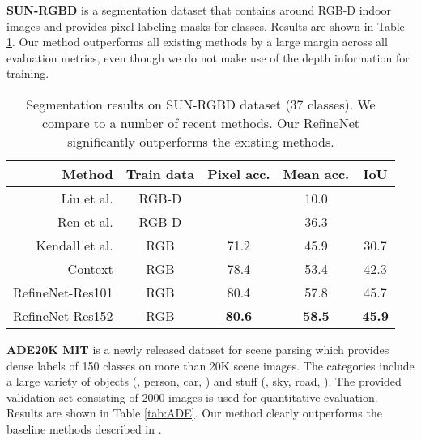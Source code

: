 \documentclass[10pt,twocolumn,letterpaper]{article}
\def\best{\bf \cellcolor[gray]{0.85}}
\def\secbest{\cellcolor[gray]{0.92} }
\newcommand{\myparagraph}[1]{\vspace{.5em}\noindent\textbf{#1}}
\begin{document}
\myparagraph{SUN-RGBD}
\cite{song2015sun} is a segmentation dataset that contains around  RGB-D indoor images and provides pixel labeling masks for  classes.
Results are shown in Table \ref{tab:sunrgbd}. Our method outperforms
all existing methods by a large margin across all evaluation metrics, even though we do not make use of the depth information for training.


\begin{table}[t]
\caption{Segmentation results on SUN-RGBD dataset (37 classes).
We compare to a number of recent methods.
Our RefineNet significantly outperforms the existing methods.}
\centering
\resizebox{.95\linewidth}{!}
  {
  \begin{tabular}{ r | c | c c c }
  Method  & Train data  & Pixel acc. & Mean acc. &IoU\\ \hline \hline
  Liu et al. \cite{liu2011sift}  &RGB-D  &  &10.0 &  \\
  Ren et al. \cite{ren2012rgb}  &RGB-D  &  &36.3 &  \\
  Kendall et al. \cite{KendallBC15} &RGB  &71.2 &45.9 &30.7 \\ 
  Context \cite{lin2016piece}  &RGB  & 78.4 & 53.4 & 42.3 \\ \hline \hline
RefineNet-Res101 &RGB  & \secbest 80.4 & \secbest 57.8 & \secbest 45.7 \\
RefineNet-Res152  & RGB & \best 80.6 & \best 58.5 & \best 45.9 \\
 \end{tabular}
  }
\label{tab:sunrgbd}
\end{table}









\myparagraph{ADE20K MIT}
\cite{ZhouZPFBT16} is a newly released dataset for scene parsing which provides dense labels of 150 classes on more than 20K scene images. The categories include a large variety of objects (\eg, person, car, \etc) and stuff (\eg, sky, road, \etc). The provided validation set consisting of 2000 images is used for quantitative evaluation. Results are shown in Table \ref{tab:ADE}. 
Our method clearly outperforms the baseline methods described in \cite{ZhouZPFBT16}.
\end{document}
